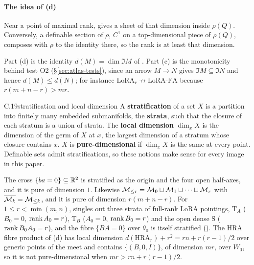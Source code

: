 \paragraph{The idea of (d)}
Near a point of maximal rank,  gives a sheet of that dimension inside $\rho(Q)$. Conversely, a definable
section of $\rho$, $C^1$ on a top-dimensional piece of $\rho(Q)$, composes with $\rho$ to the identity there, so the
rank is at least that dimension.

Part (d) is the identity $d(M)=\dim\Im M$ of . Part (c) is the monotonicity behind test O2
(\S\ref{sec:atlas-tests}), since an arrow $M\to N$ gives $\Im M\subseteq\Im N$ and hence $d(M)\le d(N)$; for instance
$\mathrm{LoRA}_r\not\to\text{LoRA-FA}$ because $r(m+n-r)>mr$.


\begin{bgentry}{C.19}{stratification and local dimension}
A \textbf{stratification} of a set $X$ is a partition into finitely many embedded submanifolds, the \textbf{strata},
such that the closure of each stratum is a union of strata. The \textbf{local dimension} $\dim_xX$ is the dimension of
the germ of $X$ at $x$, the largest dimension of a stratum whose closure contains $x$. $X$ is \textbf{pure-dimensional}
if $\dim_xX$ is the same at every point. Definable sets admit stratifications, so these notions make sense for every
image in this paper.
\end{bgentry}

The cross $\{ba=0\}\subseteq\mathbb{R}^2$ is stratified as the origin and the four open half-axes, and it is pure of dimension
$1$. Likewise $\mathcal{M}_{\le r}=\mathcal{M}_0\sqcup\mathcal{M}_1\sqcup\dots\sqcup\mathcal{M}_r$ with $\overline{\mathcal{M}_k}=\mathcal{M}_{\le k}$, and it is pure of
dimension $r(m+n-r)$. For $1\le r<\min(m,n)$,  singles out three strata of full-rank LoRA
pointings, $\mathrm T_A$ ($B_0=0$, $\operatorname{rank} A_0=r$), $\mathrm T_B$ ($A_0=0$, $\operatorname{rank} B_0=r$) and the open dense $\mathrm S$
($\operatorname{rank} B_0A_0=r$), and the fibre $\{BA=0\}$ over $\theta_0$ is itself stratified (). The HRA
fibre product of (d) has local dimension $d(\mathrm{HRA}_r)+r^2=rn+r(r-1)/2$ over generic points
of the meet and contains $\{(B,0,I)\}$, of dimension $mr$, over $W_0$, so it is not pure-dimensional when
$mr>rn+r(r-1)/2$.

